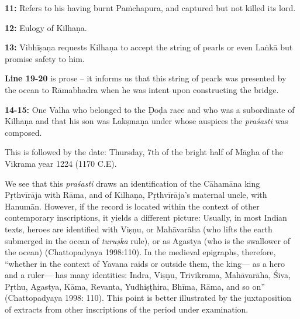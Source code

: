 \smallskip
\noindent
{\bf 11:} Refers to his having burnt Paṁchapura, and captured but not killed its lord.

\smallskip
\noindent
{\bf 12:} Eulogy of Kilhaṇa.

\smallskip
\noindent
{\bf 13:} Vibhīṣaṇa requests Kilhaṇa to accept the string of pearls or even Laṅkā but promise safety to him.

\smallskip
\noindent
{\bf Line 19-20} is prose – it informs us that this string of pearls was presented by the ocean to Rāmabhadra when he was intent upon constructing the bridge.



\noindent
{\bf 14-15:} One Valha who belonged to the Ḍoḍa race and who was a subordinate of Kilhaṇa and that his son was Lakṣmaṇa under whose auspices the {\sl praśasti} was composed.

This is followed by the date: Thursday, 7th of the bright half of Māgha of the Vikrama year 1224 (1170 C.E).

We see that this {\sl praśasti} draws an identification of the Cāhamāna king Pṛthvīrāja with Rāma, and of Kilhaṇa, Pṛthvīrāja’s maternal uncle, with Hanumān. However, if the record is located within the context of other contemporary inscriptions, it yields a different picture: Usually, in most Indian texts, heroes are identified with Viṣṇu, or Mahāvarāha (who lifts the earth submerged in the ocean of {\sl turuṣka} rule), or as Agastya (who is the swallower of the ocean) (Chattopadyaya 1998:110). In the medieval epigraphs, therefore, “whether in the context of Yavana raids or outside them, the king— as a hero and a ruler— has many identities: Indra, Viṣṇu, Trivikrama, Mahāvarāha, Śiva, Pṛthu, Agastya, Kāma, Revanta, Yudhiṣṭhira, Bhīma, Rāma, and so on” (Chattopadyaya 1998: 110). This point is better illustrated by the juxtaposition of extracts from other inscriptions of the period under examination. 

